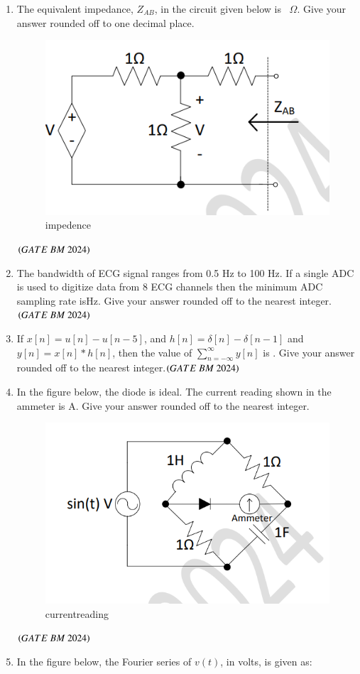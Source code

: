 \documentclass[journal,12pt,onecolumn]{IEEEtran}
\theoremstyle{remark}
\begin{document}
\begin{enumerate}
\item The equivalent impedance, $Z_{AB}$, in the circuit given below is
\underline{\hspace{2cm}}~$\Omega$. Give your answer rounded off to one
decimal place.
\begin{figure}[H]
\centering
\includegraphics[width=0.4\columnwidth]{Figs/Fig 15.png}
\caption{impedence}
\label{fig:placeholder}
\end{figure}\hfill $\brak{GATE\ BM\ 2024}$

\item The bandwidth of ECG signal ranges from 0.5 Hz to 100 Hz. If a single ADC is used to digitize data from 8 ECG channels then the minimum ADC sampling rate is\underline{\hspace{2 cm}}Hz. Give your answer rounded off to the nearest integer.\hfill $\brak{GATE\ BM\ 2024}$

\item If $x[n] = u[n] - u[n-5]$, and $h[n] = \delta[n] - \delta[n-1]$ and 
$y[n] = x[n] * h[n]$, then the value of 
$\sum_{n=-\infty}^{\infty} y[n]$ is \underline{\hspace{2cm}}. 
Give your answer rounded off to the nearest integer.\hfill $\brak{GATE\ BM\ 2024}$

\item In the figure below, the diode is ideal. The current reading shown in the ammeter is \underline{\hspace{2cm}}A. Give your answer rounded off to the nearest integer.
\begin{figure}[H]
\centering
\includegraphics[width=0.4\columnwidth]{Figs/Fig 16.png}
\caption{currentreading}
\label{fig:placeholder}
\end{figure}\hfill $\brak{GATE\ BM\ 2024}$

\item In the figure below, the Fourier series of $v(t)$, in volts, is given as:  


\end{enumerate}
\end{document}
